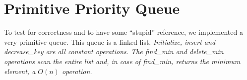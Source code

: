 \section*{Primitive Priority Queue}
To test for correctness and to have some ``stupid'' reference, we implemented a very primitive queue. This queue is a linked list. \em{Initialize}, \em{insert} and \em{decrease\_key} are all constant operations. The \em{find\_min} and \em{delete\_min} operations scan the entire list and, in case of \em{find\_min}, returns the minimum element, a $O(n)$ operation.